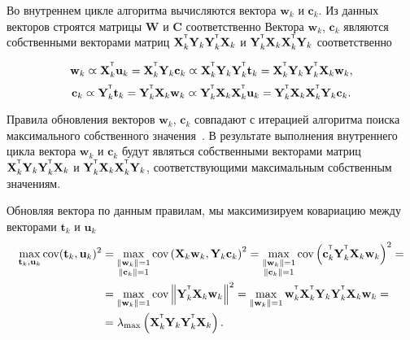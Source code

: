 \documentclass[12pt,twoside]{article}
\newcommand{\bw}{\mathbf{w}}
\newcommand{\bY}{\mathbf{Y}}
\newcommand{\bX}{\mathbf{X}}
\newcommand{\bu}{\mathbf{u}}
\newcommand{\bt}{\mathbf{t}}
\newcommand{\bc}{\mathbf{c}}
\newcommand{\bC}{\mathbf{C}}
\newcommand{\bW}{\mathbf{W}}
\begin{document}
Во внутреннем цикле алгоритма вычисляются вектора $\bw_k$ и $\bc_k$. Из данных векторов строятся матрицы $\bW$ и $\bC$ соответственно
Вектора $\bw_k$, $\bc_k$ являются собственными векторами матриц $\bX_k^{\T} \bY_k \bY_k^{\T} \bX_k$ и $\bY_k^{\T} \bX_k \bX_k^{\T} \bY_k$ соответственно

\begin{equation*}
    \bw_k \varpropto \bX_k^{\T} \bu_k = \bX_k^{\T} \bY_k \bc_k \varpropto \bX_k^{\T} \bY_k \bY_k^{\T} \bt_k = \bX_k^{\T} \bY_k \bY_k^{\T} \bX_k \bw_k,
\end{equation*}
\begin{equation*}
    \bc_k \varpropto \bY_k^{\T} \bt_k = \bY_k^{\T} \bX_k \bw_k \varpropto \bY_k^{\T} \bX_k \bX_k^{\T} \bu_k = \bY_k^{\T} \bX_k \bX_k^{\T} \bY_k \bc_k.
\end{equation*}

Правила обновления векторов $\bw_k$, $\bc_k$ совпадают с итерацией алгоритма поиска максимального собственного значения~\cite{Mises1929}. В результате выполнения внутреннего цикла вектора $\bw_k$ и $\bc_k$ будут являться собственными векторами матриц $\bX_k^{\T} \bY_k \bY_k^{\T} \bX_k$ и $\bY_k^{\T} \bX_k \bX_k^{\T} \bY_k$, соответствующими максимальным собственным значениям.

Обновляя вектора по данным правилам, мы максимизируем ковариацию между векторами $\bt_k$ и $\bu_k$
\begin{align*}
    \max_{\bt_k, \bu_k}  \text{cov} (\bt_k, \bu_k)^2 &= \max_{\substack{\|\bw_k\|=1 \\ \|\bc_k\| = 1}} \text{cov} \left( \bX_k \bw_k, \bY_k \bc_k \right)^2 = \max_{\substack{\|\bw_k\|=1 \\ \|\bc_k\| = 1}} \text{cov} \left(\bc_k^{\T}  \bY_k^{\T} \bX_k \bw_k \right)^2 = \\
    &= \max_{\|\bw_k\| = 1} \text{cov} \left\|\bY_k^{\T} \bX_k \bw_k \right\|^2 = \max_{\|\bw_k\| = 1} \bw_k^{\T} \bX_k^{\T} \bY_k \bY_k^{\T} \bX_k \bw_k = \\
    & = \lambda_{\max} \left( \bX_k^{\T} \bY_k \bY_k^{\T} \bX_k \right).
\end{align*}
\end{document}
